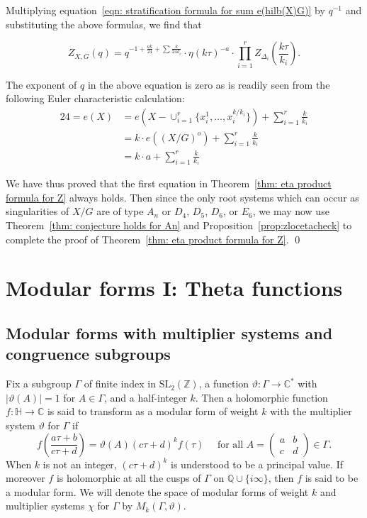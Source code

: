 \documentclass{article}
\theoremstyle{definition}
\newcommand{\CC} {{\mathbb C}}          %
\newcommand{\ZZ} {{\mathbb Z}}		%
\newcommand{\QQ} {{\mathbb Q}}		%
\begin{document}
Multiplying equation~\eqref{eqn: stratification formula for sum
e(hilb(X)G)} by $q^{-1}$ and substituting the above formulas, we find
that

\[
Z_{X,G}(q) = q^{-1 +\frac{ak}{24} + \sum \frac{k}{24k_{i}} } \cdot 
\eta (k\tau )^{-a}\cdot 
\prod_{i=1}^{r}Z_{\Delta_{i}}\left(\frac{k\tau}{k_{i}} \right) .
\]

The exponent of $q$ in the above equation is zero as is readily seen
from the following Euler characteristic calculation:
\begin{align*}
24 = e(X) &= e\left(X-\cup_{i=1}^{r} \{x_{i}^{1},\dotsc
,x_{i}^{k/k_{i}} \} \right) + \sum_{i=1}^{r} \frac{k}{k_{i}} \\
&= k \cdot e\left((X/G)^{o} \right) + \sum_{i=1}^{r} \frac{k}{k_{i}} \\
&= k\cdot a + \sum_{i=1}^{r}\frac{k}{k_{i}} 
\end{align*}

We have thus proved that the first equation in Theorem~\ref{thm: eta
product formula for Z} always holds. Then since the only root systems
which can occur as singularities of $X/G$ are of type $A_{n}$ or
$D_{4}$, $D_{5}$, $D_{6}$, or $E_{6}$, we may now use
Theorem~\ref{thm: conjecture holds for An} and Proposition~\ref{prop:zlocetacheck} to
complete the proof of Theorem~\ref{thm: eta product formula for
Z}. \qed

\section{Modular forms I: Theta functions}\label{sec: modular forms}

\subsection{Modular forms with multiplier systems and congruence subgroups}

Fix a
subgroup $\Gamma$ of finite index in $\mathrm{SL_2}( \ZZ)$, a function $\vartheta \colon
\Gamma \to  \CC^{\ast}$ with $|\vartheta(A)|=1$ for $A \in \Gamma$, and a half-integer $k$.
Then a holomorphic function $f \colon \mathbb{H} \to  \CC$ is said to transform as a modular
form of weight $k$ with the multiplier system $\vartheta$ for $\Gamma$ if
\[ f\left( \frac{a\tau+b}{c\tau+d}\right)=\vartheta(A)(c\tau+d)^k f(\tau) \quad 
\textrm{ for all } A=\begin{pmatrix}
a & b \\ c & d
\end{pmatrix} \in \Gamma. \]
When $k$ is not an integer, $(c\tau+d)^k$ is understood to be a principal value. If moreover
$f$ is holomorphic at all the cusps of $\Gamma$ on $ \QQ \cup \{i \infty\}$, then $f$ is said
to be a modular form. We will denote the space of modular forms of weight $k$ and multiplier
systems $\chi$ for $\Gamma$ by $M_k(\Gamma, \vartheta)$.
\end{document}
